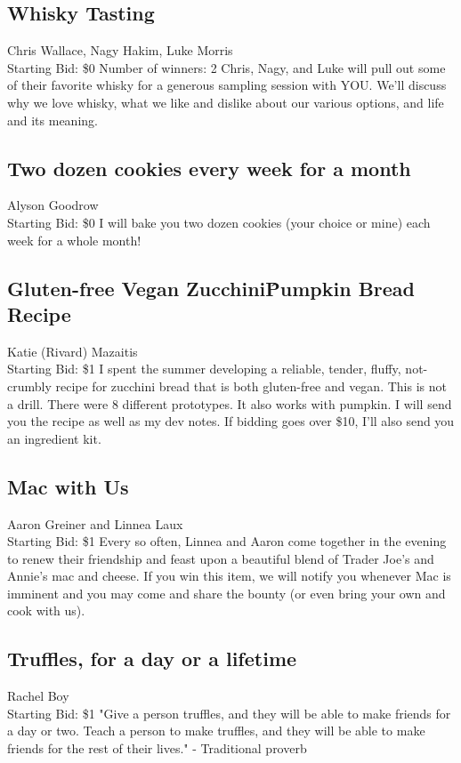 \documentclass[11pt]{article}
\begin{document}
\subsection{Whisky Tasting}
Chris Wallace, Nagy Hakim, Luke Morris
\\
Starting Bid: \$0
\newline
Number of winners: 2
\newline
Chris, Nagy, and Luke will pull out some of their favorite whisky for a generous sampling session with YOU. We'll discuss why we love whisky, what we like and dislike about our various options, and life and its meaning.
\subsection{Two dozen cookies every week for a month}
Alyson Goodrow
\\
Starting Bid: \$0
\newline
I will bake you two dozen cookies (your choice or mine) each week for a whole month!
\subsection{Gluten-free Vegan Zucchini\^Pumpkin Bread Recipe}
Katie (Rivard) Mazaitis
\\
Starting Bid: \$1
\newline
I spent the summer developing a reliable, tender, fluffy, not-crumbly recipe for zucchini bread that is both gluten-free and vegan. This is not a drill. There were 8 different prototypes. It also works with pumpkin. I will send you the recipe as well as my dev notes. If bidding goes over \$10, I'll also send you an ingredient kit.
\subsection{Mac with Us}
Aaron Greiner and Linnea Laux
\\
Starting Bid: \$1
\newline
Every so often, Linnea and Aaron come together in the evening to renew their friendship and feast upon a beautiful blend of Trader Joe's and Annie's mac and cheese. If you win this item, we will notify you whenever Mac is imminent and you may come and share the bounty (or even bring your own and cook with us).
\subsection{Truffles, for a day or a lifetime}
Rachel Boy
\\
Starting Bid: \$1
\newline
"Give a person truffles, and they will be able to make friends for a day or two. Teach a person to make truffles, and they will be able to make friends for the rest of their lives."
- Traditional proverb
\end{document}
